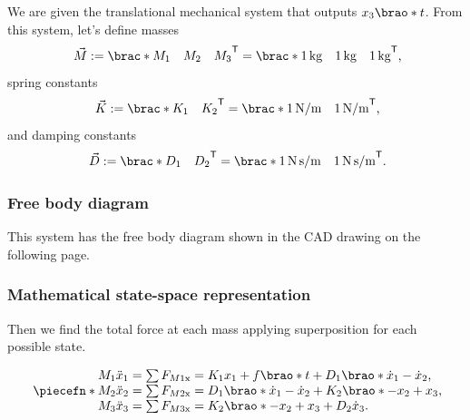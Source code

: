 \documentclass[12pt]{article}
\newcommand*\transpose{\mathsf{T}}
\DeclarePairedDelimiter\brao()%
\DeclarePairedDelimiter\brac[]%
\DeclarePairedDelimiter\piecefn\{.
\begin{document}
We are given the translational mechanical system
that outputs $x_3\brao*t$.
From this system, let's define masses
\begin{equation}
    \vec{M} := \brac*{
        \begin{matrix} M_1 & M_2 & M_3 \end{matrix}
    }^\transpose = \brac*{
        \begin{matrix} \SI1{\kilo\gram} & \SI1{\kilo\gram} & \SI1{\kilo\gram} \end{matrix}
    }^\transpose\rlap,
\end{equation}
spring constants
\begin{equation}
    \vec{K} := \brac*{
        \begin{matrix} K_1 & K_2 \end{matrix}
    }^\transpose = \brac*{
        \begin{matrix} \SI1{\newton\per\meter} & \SI1{\newton\per\meter} \end{matrix}
    }^\transpose\rlap,
\end{equation}
and damping constants
\begin{equation}
    \vec{D} := \brac*{
        \begin{matrix} D_1 & D_2 \end{matrix}
    }^\transpose = \brac*{
        \begin{matrix} \SI1{\newton\second\per\meter} & \SI1{\newton\second\per\meter} \end{matrix}
    }^\transpose\rlap.
\end{equation}

\subsubsection{Free body diagram}
This system has the free body diagram shown in the CAD drawing on the following page.


\subsubsection{Mathematical state-space representation}

Then we find the total force at each mass applying superposition for each possible state.

\begin{equation}
    \piecefn*{
        \begin{array}{@{}l@{}}
            M_1 \ddot{x}_1 = \sum F_{M1\mathrm{x}} = K_1 x_1 + f\brao*t + D_1 \brao*{\dot{x}_1 - \dot{x}_2}\rlap,
        \\*
            M_2 \ddot{x}_2 = \sum F_{M2\mathrm{x}} = D_1\brao*{\dot{x}_1 - \dot{x}_2} + K_2\brao*{-x_2 + x_3}\rlap,
        \\*
            M_3 \ddot{x}_3 = \sum F_{M3\mathrm{x}} = K_2\brao*{-x_2 + x_3} + D_2\dot{x}_3\rlap.
        \\*
        \end{array}
    }
\end{equation}
\end{document}
